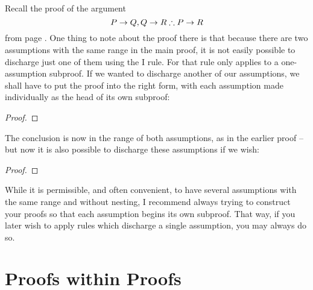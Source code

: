 Recall the proof of the argument $$P \rightarrow Q, Q \rightarrow R \mathrel{\therefore} P \rightarrow R$$ from page \pageref{HSproof}. One thing to note about the proof there is that because there are two assumptions with the same range in the main proof, it is not easily possible to discharge just one of them using the {\eif}I rule. For that rule only applies to a one-assumption subproof. If we wanted to discharge another of our assumptions, we shall have to put the proof into the right form, with each assumption made individually as the head of its own subproof:
\begin{proof}
	\open
	\open
	\close
\end{proof} The conclusion is now in the range of both assumptions, as in the earlier proof – but now it is also possible to discharge these assumptions if we wish: \begin{proof}
	\open {}
	\open
	\open
	\close
	\close
	\close
\end{proof} 
While it is permissible, and often convenient, to have several assumptions with the same range and without nesting, I recommend always trying to construct your proofs so that each assumption begins its own subproof. That way, if you later wish to apply rules which discharge a single assumption, you may always do so.

\section{Proofs within Proofs}

